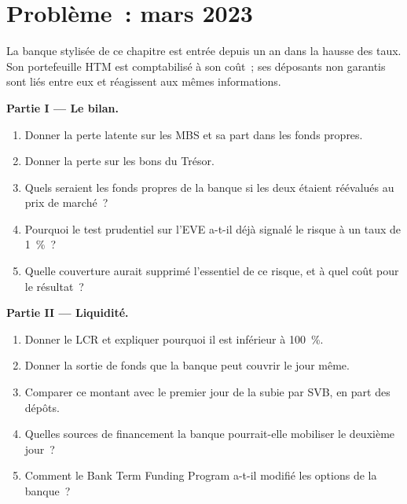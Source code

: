 \section{Problème~: mars 2023}

\begin{problem}\label{pb:rc:liquidity-and-funding-risk-bank-treasury:1}
La banque stylisée de ce chapitre est entrée depuis un an dans la hausse des taux. Son portefeuille HTM est comptabilisé à son coût~;
ses déposants non garantis sont liés entre eux et réagissent aux mêmes informations.

\medskip\noindent\textbf{Partie I --- Le bilan.}
\begin{enumerate}
\item Donner la perte latente sur les MBS et sa part dans les fonds propres.
\item Donner la perte sur les bons du Trésor.
\item Quels seraient les fonds propres de la banque si les deux étaient réévalués au prix de marché~?
\item Pourquoi le test prudentiel sur l'EVE a-t-il déjà signalé le risque à un taux de 1~\%~?
\item Quelle couverture aurait supprimé l'essentiel de ce risque, et à quel coût pour le résultat~?
\end{enumerate}

\medskip\noindent\textbf{Partie II --- Liquidité.}
\begin{enumerate}[resume]
\item Donner le LCR et expliquer pourquoi il est inférieur à 100~\%.
\item Donner la sortie de fonds que la banque peut couvrir le jour même.
\item Comparer ce montant avec le premier jour de la  subie par SVB, en part des dépôts.
\item Quelles sources de financement la banque pourrait-elle mobiliser le deuxième jour~?
\item Comment le Bank Term Funding Program a-t-il modifié les options de la banque~?
\end{enumerate}


\end{problem}
